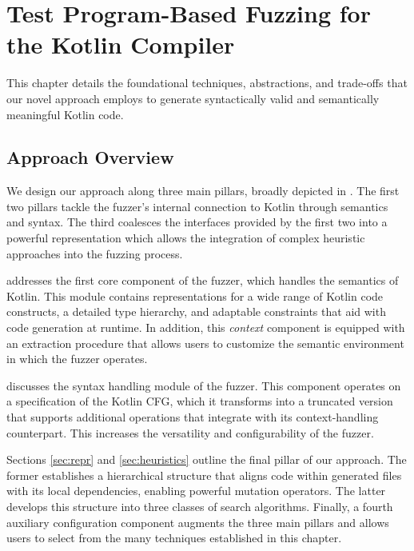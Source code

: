 \chapter{\label{cha:algorithm} Test Program-Based Fuzzing for the Kotlin Compiler}

This chapter details the foundational techniques, abstractions,
and trade-offs that our novel approach employs to generate syntactically
valid and semantically meaningful Kotlin code.
\section{\label{sec:approachoverview}Approach Overview}

We design our approach along three main pillars, broadly depicted in .
The first two pillars tackle the fuzzer's internal connection to Kotlin
through semantics and syntax.
The third coalesces the interfaces provided by the first two
into a powerful representation which allows the integration of complex
heuristic approaches into the fuzzing process.

 addresses the first core component of the fuzzer,
which  handles the semantics of Kotlin.
This module contains representations for a wide range
of Kotlin code constructs, a detailed type hierarchy, and
adaptable constraints that aid with code generation at runtime.
In addition, this \textit{context} component is equipped with
an extraction procedure that allows users to customize
the semantic environment in which the fuzzer operates.

 discusses the syntax handling module of the fuzzer.
This component operates on a specification of the Kotlin \gls{CFG},
which it transforms into a truncated version that supports
additional operations that integrate with its context-handling
counterpart.
This increases the versatility and configurability of the fuzzer.

Sections \ref{sec:repr} and \ref{sec:heuristics} outline the final pillar
of our approach.
The former establishes a hierarchical structure that aligns code
within generated files with its local dependencies, enabling
powerful mutation operators.
The latter develops this structure into three classes of
search algorithms.
Finally, a fourth auxiliary configuration component
augments the three main pillars and allows users
to select from the many techniques established in this chapter.


